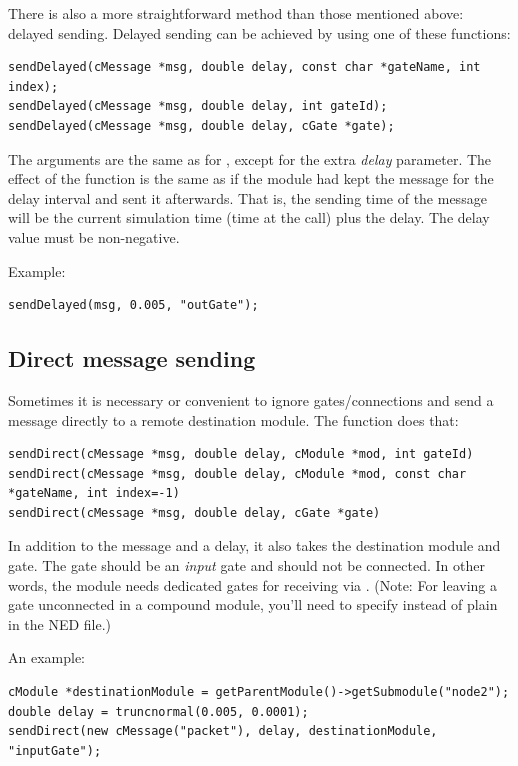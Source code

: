 There is also a more straightforward method than those mentioned above:
delayed sending. Delayed sending can be achieved
by using one of these functions:

\begin{verbatim}
sendDelayed(cMessage *msg, double delay, const char *gateName, int index);
sendDelayed(cMessage *msg, double delay, int gateId);
sendDelayed(cMessage *msg, double delay, cGate *gate);
\end{verbatim}

The arguments are the same as for , except for the extra \textit{delay}
parameter. The effect of the function is the same as if the module
had kept the message for the delay interval and sent it afterwards.
That is, the sending time of the message will be the current
simulation time (time at the  call) plus the delay.
The delay value must be non-negative.

Example:

\begin{verbatim}
sendDelayed(msg, 0.005, "outGate");
\end{verbatim}



\subsection{Direct message sending}

Sometimes it is necessary or convenient to ignore gates/connections
and send a message directly to a remote destination module. The 
function does that:

\begin{verbatim}
sendDirect(cMessage *msg, double delay, cModule *mod, int gateId)
sendDirect(cMessage *msg, double delay, cModule *mod, const char *gateName, int index=-1)
sendDirect(cMessage *msg, double delay, cGate *gate)
\end{verbatim}

In addition to the message and a delay, it also takes the destination module
and gate. The gate should be an \textit{input} gate and should not be connected.
In other words, the module needs dedicated gates for receiving via .
(Note: For leaving a gate unconnected in a compound module, you'll need to specify
 instead of plain  in the NED file.)

An example:

\begin{verbatim}
cModule *destinationModule = getParentModule()->getSubmodule("node2");
double delay = truncnormal(0.005, 0.0001);
sendDirect(new cMessage("packet"), delay, destinationModule, "inputGate");
\end{verbatim}

